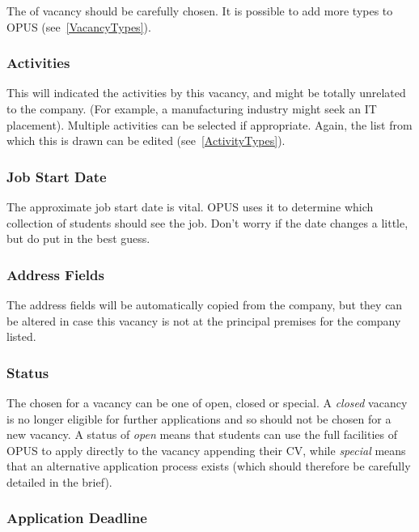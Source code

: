 \documentclass[12 pt]{book}
\begin{document}
The  of vacancy should be carefully chosen. It is possible to
add more types to OPUS (see~\ref{VacancyTypes}).

\subsubsection{Activities}

This will indicated the activities by this vacancy, and might be totally
unrelated to the company. (For example, a manufacturing industry might seek
an IT placement). Multiple activities can be selected if appropriate. Again,
the list from which this is drawn can be edited (see~\ref{ActivityTypes}).

\subsubsection{Job Start Date}

The approximate job start date is vital. OPUS uses it to determine which
collection of students should see the job. Don't worry if the date changes a
little, but do put in the best guess.

\subsubsection{Address Fields}

The address fields will be automatically copied from the company, but they can
be altered in case this vacancy is not at the principal premises for the 
company listed.

\subsubsection{Status}

The  chosen for a vacancy can be one of open, closed or 
special. A \emph{closed} vacancy is no longer eligible for further applications
and so should not be chosen for a new vacancy. A status of \emph{open} means 
that students can use the full facilities of OPUS to apply directly to the
vacancy appending their CV, while \emph{special} means that an alternative
application process exists (which should therefore be carefully detailed in the
brief).

\subsubsection{Application Deadline}
\end{document}
